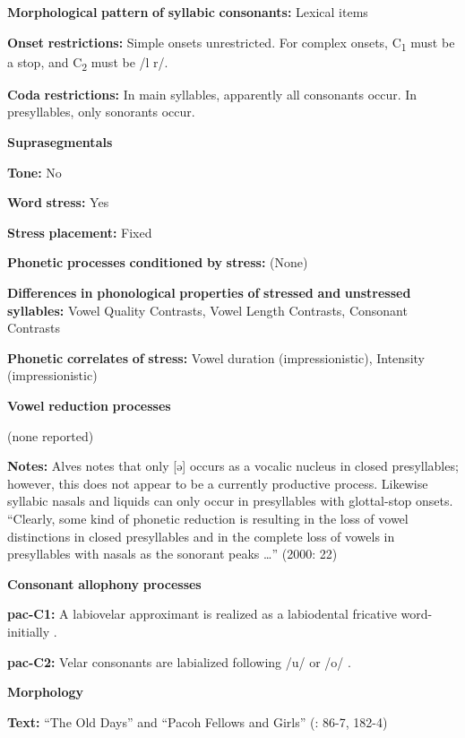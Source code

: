 \textbf{Morphological} \textbf{pattern} \textbf{of} \textbf{syllabic} \textbf{consonants:} Lexical items

\textbf{Onset} \textbf{restrictions:} Simple onsets unrestricted. For complex onsets, C\textsubscript{1} must be a stop, and C\textsubscript{2} must be /l r/. 

\textbf{Coda} \textbf{restrictions:} In main syllables, apparently all consonants occur. In presyllables, only sonorants occur.

\textbf{Suprasegmentals}

\textbf{Tone:} No

\textbf{Word} \textbf{stress:} Yes

\textbf{Stress} \textbf{placement:} Fixed

\textbf{Phonetic} \textbf{processes} \textbf{conditioned} \textbf{by} \textbf{stress:} (None)

\textbf{Differences} \textbf{in} \textbf{phonological} \textbf{properties} \textbf{of} \textbf{stressed} \textbf{and} \textbf{unstressed} \textbf{syllables:} Vowel Quality Contrasts, Vowel Length Contrasts, Consonant Contrasts

\textbf{Phonetic} \textbf{correlates} \textbf{of} \textbf{stress:} Vowel duration (impressionistic), Intensity (impressionistic)

\textbf{Vowel} \textbf{reduction} \textbf{processes}

(none reported)

\textbf{Notes:} Alves notes that only [ə] occurs as a vocalic nucleus in closed presyllables; however, this does not appear to be a currently productive process. Likewise syllabic nasals and liquids can only occur in presyllables with glottal-stop onsets. “Clearly, some kind of phonetic reduction is resulting in the loss of vowel distinctions in closed presyllables and in the complete loss of vowels in presyllables with nasals as the sonorant peaks …” (2000: 22)

\textbf{Consonant} \textbf{allophony} \textbf{processes}

\textbf{pac-C1:} A labiovelar approximant is realized as a labiodental fricative word-initially \citep[11]{Alves2006}.

\textbf{pac-C2:} Velar consonants are labialized following /u/ or /o/ \citep[12]{Alves2006}.

\textbf{Morphology}

\textbf{Text:} “The Old Days” and “Pacoh Fellows and Girls” (\citealt{Watson1980}: 86-7, 182-4)

